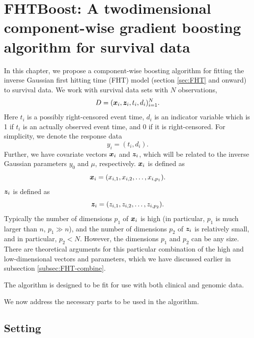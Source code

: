 \chapter{FHTBoost: A twodimensional component-wise gradient boosting algorithm for survival data}
\label{ch:FHTboost}
In this chapter, we propose a component-wise boosting algorithm for fitting the inverse Gaussian first hitting time (FHT) model (section \ref{sec:FHT} and onward) to survival data.
We work with survival data sets with $N$ observations,
\begin{equation*}
    D=(\bm{x}_i,\bm{z}_i,t_i,d_i)_{i=1}^N.
\end{equation*}
Here $t_i$ is a possibly right-censored event time, $d_i$ is an indicator variable which is 1 if $t_i$ is an actually observed event time, and 0 if it is right-censored.
For simplicity, we denote the response data
\begin{equation*}
    y_i=(t_i,d_i).
\end{equation*}
Further, we have covariate vectors $\bm{x}_i$ and $\bm{z}_i$, which will be related to the inverse Gaussian parameters $y_0$ and $\mu$, respectively.
$\bm{x}_i$ is defined as
\begin{equation}
    \bm{x}_i=(x_{i,1},x_{i,2},\ldots,x_{i,p_1}).
\end{equation}
$\bm{z}_i$ is defined as
\begin{equation}
    \bm{z}_i=(z_{i,1},z_{i,2},\ldots,z_{i,p_2}).
\end{equation}
Typically the number of dimensions $p_1$ of $\bm{x}_i$ is high (in particular, $p_1$ is much larger than $n$, $p_1 \gg n$), and the number of dimensions $p_2$ of $\bm{z}_i$ is relatively small, and in particular, $p_2 < N$.
However, the dimensions $p_1$ and $p_2$ can be any size.
There are theoretical arguments for this particular combination of the high and low-dimensional vectors and parameters, which we have discussed earlier in subsection \ref{subsec:FHT-combine}.

The algorithm is designed to be fit for use with both clinical and genomic data.

We now address the necessary parts to be used in the algorithm.

\section{Setting}
